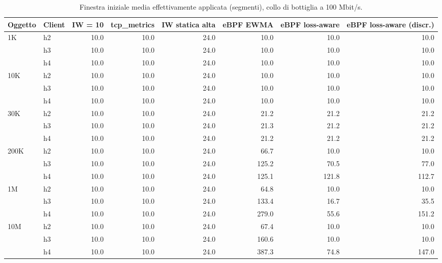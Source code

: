\begin{table}[htbp]
  \centering
  \caption{Finestra iniziale media effettivamente applicata (segmenti), collo di bottiglia a 100 Mbit/s.}
  \label{tab:iw-100}
  \begin{tabular}{llrrrrrr}
    \toprule
    Oggetto & Client & IW = 10 & tcp\_metrics & IW statica alta & eBPF EWMA & eBPF loss-aware & eBPF loss-aware (discr.) \\
    \midrule
    1K & h2 & 10.0 & 10.0 & 24.0 & 10.0 & 10.0 & 10.0 \\
     & h3 & 10.0 & 10.0 & 24.0 & 10.0 & 10.0 & 10.0 \\
     & h4 & 10.0 & 10.0 & 24.0 & 10.0 & 10.0 & 10.0 \\
    \addlinespace
    10K & h2 & 10.0 & 10.0 & 24.0 & 10.0 & 10.0 & 10.0 \\
     & h3 & 10.0 & 10.0 & 24.0 & 10.0 & 10.0 & 10.0 \\
     & h4 & 10.0 & 10.0 & 24.0 & 10.0 & 10.0 & 10.0 \\
    \addlinespace
    30K & h2 & 10.0 & 10.0 & 24.0 & 21.2 & 21.2 & 21.2 \\
     & h3 & 10.0 & 10.0 & 24.0 & 21.3 & 21.2 & 21.2 \\
     & h4 & 10.0 & 10.0 & 24.0 & 21.2 & 21.2 & 21.2 \\
    \addlinespace
    200K & h2 & 10.0 & 10.0 & 24.0 & 66.7 & 10.0 & 10.0 \\
     & h3 & 10.0 & 10.0 & 24.0 & 125.2 & 70.5 & 77.0 \\
     & h4 & 10.0 & 10.0 & 24.0 & 125.1 & 121.8 & 112.7 \\
    \addlinespace
    1M & h2 & 10.0 & 10.0 & 24.0 & 64.8 & 10.0 & 10.0 \\
     & h3 & 10.0 & 10.0 & 24.0 & 133.4 & 16.7 & 35.5 \\
     & h4 & 10.0 & 10.0 & 24.0 & 279.0 & 55.6 & 151.2 \\
    \addlinespace
    10M & h2 & 10.0 & 10.0 & 24.0 & 67.4 & 10.0 & 10.0 \\
     & h3 & 10.0 & 10.0 & 24.0 & 160.6 & 10.0 & 10.0 \\
     & h4 & 10.0 & 10.0 & 24.0 & 387.3 & 74.8 & 147.0 \\
    \bottomrule
  \end{tabular}
\end{table}
